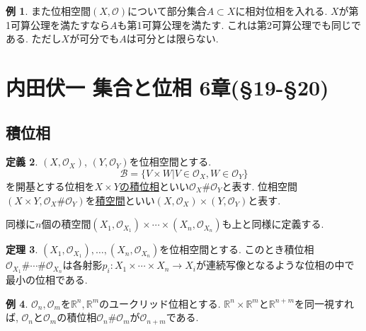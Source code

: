 \documentclass[dvipdfmx,a4paper,11pt]{article}
\newcommand{\R}{\mathbb{R}}
\theoremstyle{definition}
\newtheorem{thm}{定理}
\newtheorem{dfn}[thm]{定義}
\newtheorem{exa}[thm]{例}
\begin{document}
\begin{exa}
また位相空間$(X, \mathscr{O})$について部分集合$A \subset X$に相対位相を入れる.
$X$が第1可算公理を満たすなら$A$も第1可算公理を満たす. これは第2可算公理でも同じである.
ただし$X$が可分でも$A$は可分とは限らない.
\end{exa}

\newpage


\section{内田伏一 集合と位相 6章(\S19-\S20)}


\subsection{積位相}
\begin{tcolorbox}[
    colback = white,
    colframe = green!35!black,
    fonttitle = \bfseries,
    breakable = true]
    \begin{dfn}
$(X, \mathscr{O}_X )$, $(Y, \mathscr{O}_Y)$を位相空間とする.
$$
\mathscr{B} = \{ V \times W | V \in \mathscr{O}_X, W \in \mathscr{O}_Y\}
$$
を開基とする位相を\underline{$X \times Y$の積位相}といい$\mathscr{O}_X \# \mathscr{O}_Y$と表す.
位相空間$(X \times Y, \mathscr{O}_X \# \mathscr{O}_Y)$を\underline{積空間}といい$(X, \mathscr{O}_X ) \times (Y, \mathscr{O}_Y)$と表す.
  \end{dfn}
 \end{tcolorbox}
 同様に$n$個の積空間$(X_1, \mathscr{O}_{X_1} ) \times \cdots \times (X_n, \mathscr{O}_{X_n} )$も上と同様に定義する.
 
 \begin{tcolorbox}[
    colback = white,
    colframe = green!35!black,
    fonttitle = \bfseries,
    breakable = true]
    \begin{thm}
$(X_1, \mathscr{O}_{X_1} ) , \ldots ,(X_n, \mathscr{O}_{X_n} )$を位相空間とする.
このとき積位相$\mathscr{O}_{X_1} \# \cdots \# \mathscr{O}_{X_n}$は各射影$p_i : X_1\times \cdots \times X_n \rightarrow X_i$が連続写像となるような位相の中で最小の位相である.
  \end{thm}
 \end{tcolorbox}
 
 \begin{exa}
 $\mathscr{O}_n, \mathscr{O}_m$を$\R^n,\R^m$のユークリッド位相とする. $\R^n \times \R^m $と$\R^{n+m}$を同一視すれば, $\mathscr{O}_n$と$\mathscr{O}_m$の積位相$\mathscr{O}_n \#\mathscr{O}_m$が$\mathscr{O}_{n+m}$である.
 \end{exa}
\end{document}
